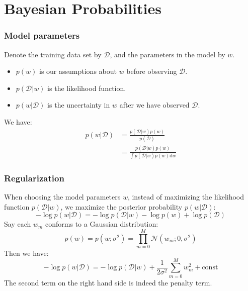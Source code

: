 \documentclass{beamer}
\begin{document}
\section{Bayesian Probabilities}

\begin{frame}
    \frametitle{Model parameters}
    Denote the training data set by $\mathcal{D}$, and the parameters in the model by $w$.
    \begin{itemize}
        \item $p(w)$ is our assumptions about $w$ before observing $\mathcal{D}$.
        \item $p(\mathcal{D}|w)$ is the likelihood function.
        \item $p(w|\mathcal{D})$ is the uncertainty in $w$ after we have observed $\mathcal{D}$.
    \end{itemize}
    We have:
    \begin{align*}
        p(w|\mathcal{D})&=\frac{p(\mathcal{D}|w)p(w)}{p(\mathcal{D})} \\
        &=\frac{p(\mathcal{D}|w)p(w)}{\int{}p(\mathcal{D}|w)p(w)\mathrm{d}w}
    \end{align*}
\end{frame}

\begin{frame}
    \frametitle{Regularization}
    When choosing the model parameters $w$, instead of maximizing the likelihood function $p(\mathcal{D}|w)$, we maximize the posterior probability $p(w|\mathcal{D})$:
    \begin{equation*}
        -\log{}p(w|\mathcal{D})=-\log{}p(\mathcal{D}|w)-\log{}p(w)+\log{}p(\mathcal{D})
    \end{equation*}
    Say each $w_{m}$ conforms to a Gaussian distribution:
    \begin{equation*}
        p(w)=p(w;\sigma^{2})=\prod_{m=0}^{M}\mathcal{N}(w_{m};0,\sigma^{2})
    \end{equation*}
    Then we have:
    \begin{equation*}
        -\log{}p(w|\mathcal{D})=-\log{}p(\mathcal{D}|w)+\frac{1}{2\sigma^{2}}\sum_{m=0}^{M}w_{m}^{2}+\mathrm{const}
    \end{equation*}
    The second term on the right hand side is indeed the penalty term.
\end{frame}
\end{document}
